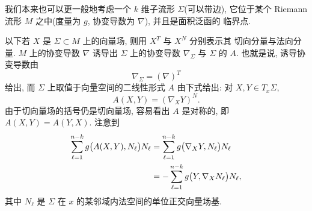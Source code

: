 我们本来也可以更一般地考虑一个 $k$ 维子流形 $\Sigma$(可以带边), 它位于某个
Riemann 流形 $M$ 之中(度量为 $g$, 协变导数为 $\nabla$), 并且是面积泛函的
临界点.

以下若 $X$ 是 $\Sigma\subset M$ 上的向量场, 则用 $X^T$ 与 $X^N$ 分别表示其
切向分量与法向分量. $M$ 上的协变导数 $\nabla$ 诱导出 $\Sigma$ 上的协变导数
$\nabla_{\Sigma}$ 与 $\Sigma$ 的 $A$. 也就是说, 诱导协变导数由
\begin{equation}
\nabla_{\Sigma}=(\nabla)^T
\label{eq:1.23}
\end{equation}
给出, 而 $\Sigma$ 上取值于向量空间的二线性形式 $A$ 由下式给出: 对
$X,Y\in T_x\Sigma$,
\begin{equation}
A(X,Y)=(\nabla_XY)^N.
\label{eq:1.24}
\end{equation}
由于切向量场的括号仍是切向量场, 容易看出 $A$ 是对称的, 即 $A(X,Y)=A(Y,X)$.
注意到
\begin{align}
\sum_{\ell=1}^{n-k}g\bigl(A(X,Y),N_\ell\bigr)N_\ell
 &=\sum_{\ell=1}^{n-k}g\bigl(\nabla_XY,N_\ell\bigr)N_\ell \notag\\
 &=-\sum_{\ell=1}^{n-k}g\bigl(Y,\nabla_XN_\ell\bigr)N_\ell,
\label{eq:1.25}
\end{align}
其中 $N_\ell$ 是 $\Sigma$ 在 $x$ 的某邻域内法空间的单位正交向量场基.

